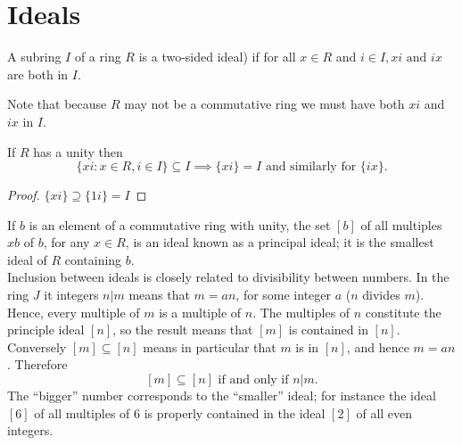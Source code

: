 \section{Ideals}

\begin{definition}
A subring  $I$ of a ring $R$ is a two-sided ideal) if for all $x\in R$ and $i\in I, xi \mbox{ and } ix$ are both in $I$.
\end{definition}

Note that because $R$ may not be a commutative ring we must have both $xi$ and $ix$ in $I$. 

\begin{theorem}
If $R$ has a unity then 
\[ \{ xi: x\in R, i \in I \} \subseteq I \implies \{xi\} = I \mbox{ and similarly for } \{ ix \}.\]
\end{theorem}
\begin{proof}
$ \{ xi \} \supseteq \{ 1i \} = I $
\end{proof}

If $b$ is an element of a commutative ring with unity, the set $[b]$ of all multiples $xb$ of $b$, for any $x\in R$, is an ideal known as a {\twelveit principal ideal}; it is the smallest ideal of $R$ containing $b$. \\

Inclusion between ideals is closely related to divisibility between numbers. In the ring $J$ it integers $n|m$ means that $m = an$, for some integer $a$ ($n$ divides $m$). Hence, every multiple of $m$ is a multiple of $n$. The multiples of $n$ constitute the principle ideal $[n]$, so the result means that $[m]$ is contained in $[n]$. Conversely $[m] \subseteq [n]$ means in particular that $m$ is in $[n]$, and hence $m= an$. Therefore 
\[ [m] \subseteq [n]  \mbox{ if and only if } n|m.\]
The ``bigger'' number corresponds to the ``smaller'' ideal; for instance the ideal $[6]$ of all multiples of 6 is properly contained in the ideal $[2]$ of all even integers. 


